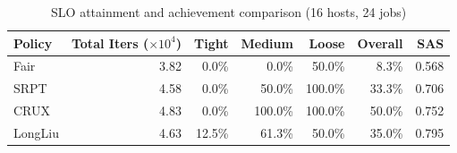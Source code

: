 \begin{table}[t]
\centering
\caption{SLO attainment and achievement comparison (16 hosts, 24 jobs)}
\label{tab:slo_16host}
\begin{tabular}{l|r|r|r|r|r|r}
\hline
Policy & Total Iters ($\times 10^4$) & Tight & Medium & Loose & Overall & SAS \\
\hline
Fair & 3.82 & 0.0\% & 0.0\% & 50.0\% & 8.3\% & 0.568 \\
SRPT & 4.58 & 0.0\% & 50.0\% & 100.0\% & 33.3\% & 0.706 \\
CRUX & 4.83 & 0.0\% & 100.0\% & 100.0\% & 50.0\% & 0.752 \\
LongLiu & 4.63 & 12.5\% & 61.3\% & 50.0\% & 35.0\% & 0.795 \\
\hline
\end{tabular}
\end{table}

